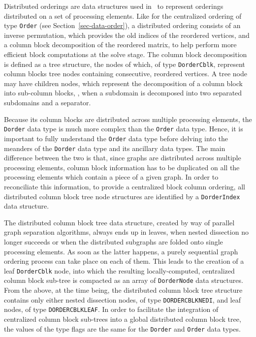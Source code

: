 Distributed orderings are data structures used in \ptscotch\ to
represent orderings distributed on a set of processing elements. Like
for the centralized ordering of type \texttt{Order} (see
Section~\ref{sec-data-order}), a distributed ordering consists of an
inverse permutation, which provides the old indices of the reordered
vertices, and a column block decomposition of the reordered matrix, to
help perform more efficient block computations at the solve stage. The
column block decomposition is defined as a tree structure, the nodes
of which, of type \texttt{Dorder\lbt Cblk}, represent column blocks
tree nodes containing consecutive, reordered vertices. A tree node may
have children nodes, which represent the decomposition of a column
block into sub-column blocks, \eg, when a subdomain is decomposed into
two separated subdomains and a separator.

Because its column blocks are distributed across multiple processing
elements, the \texttt{Dorder} data type is much more complex than
the \texttt{Order} data type. Hence, it is important to fully
understand the \texttt{Order} data type before delving into the
meanders of the \texttt{Dorder} data type and its ancillary data
types. The main difference between the two is that, since graphs are
distributed across multiple processing elements, column block
information has to be duplicated on all the processing elements
which contain a piece of a given graph. In order to reconciliate this
information, to provide a centralized block column ordering, all
distributed column block tree node structures are identified by a
\texttt{Dorder\lbt Index} data structure.

The distributed column block tree data structure, created by way of
parallel graph separation algorithms, always ends up in leaves, when
nested dissection no longer succeeds or when the distributed subgraphs
are folded onto single processing elements. As soon as the latter
happens, a purely sequential graph ordering process can take place on
each of them. This leads to the creation of a leaf
\texttt{Dorder\lbt Cblk} node, into which the resulting
locally-computed, centralized column block sub-tree is compacted as an
array of \texttt{Dorder\lbt Node} data structures. From the above, at
the time being, the distributed column block tree structure contains
only either nested dissection nodes, of type
\texttt{DORDER\lbt CBLK\lbt NEDI}, and leaf nodes, of type 
\texttt{DORDER\lbt CBLK\lbt LEAF}. In order to facilitate the
integration of centralized column block sub-trees into a global
distributed column block tree, the values of the type flags are the
same for the \texttt{Dorder} and \texttt{Order} data types.

